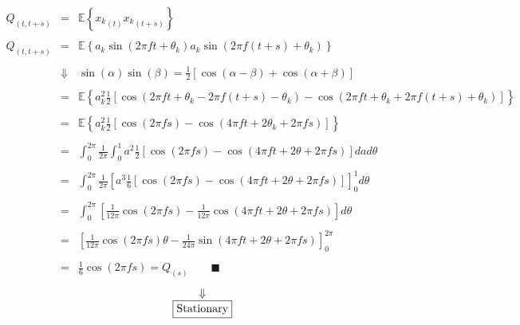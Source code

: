 \documentclass[11pt, a4paper]{article}
\begin{document}
\begin{equation}
    \begin{array}{rcl}
        Q_{\left(t,t+s\right)} & = & \displaystyle \mathbb{E}\left\{{x_k}_{\left(t\right)}{x_k}_{\left(t+s\right)}\right\} \\\\
        Q_{\left(t,t+s\right)} & = & \displaystyle \mathbb{E}\left\{a_k\sin{\left(2\pi ft+\theta_k\right)}a_k\sin{\left(2\pi f\left(t+s\right)+\theta_k\right)}\right\} \\\\
        & \Downarrow & \displaystyle \sin{\left(\alpha\right)}\sin{\left(\beta\right)}=\frac{1}{2}\left[\cos\left(\alpha-\beta\right)+\cos\left(\alpha+\beta\right)\right] \\\\
        & = & \displaystyle \mathbb{E}\left\{a_k^2\frac{1}{2}\left[\cos\left(2\pi ft+\theta_k-2\pi f\left(t+s\right)-\theta_k\right)-\cos\left(2\pi ft+\theta_k+2\pi f\left(t+s\right)+\theta_k\right)\right]\right\} \\\\
        & = & \displaystyle \mathbb{E}\left\{a_k^2\frac{1}{2}\left[\cos\left(2\pi fs\right)-\cos\left(4\pi ft+2\theta_k+2\pi fs\right)\right]\right\} \\\\
        & = & \displaystyle \int_{0}^{2\pi}{\frac{1}{2\pi}\int_{0}^{1}{a^2\frac{1}{2}\left[\cos\left(2\pi fs\right)-\cos\left(4\pi ft+2\theta+2\pi fs\right)\right]da}d\theta} \\\\
        & = & \displaystyle \int_{0}^{2\pi}{\frac{1}{2\pi}\left[a^3\frac{1}{6}\left[\cos\left(2\pi fs\right)-\cos\left(4\pi ft+2\theta+2\pi fs\right)\right]\right]_0^1d\theta} \\\\
        & = & \displaystyle \int_{0}^{2\pi}{\left[\frac{1}{12\pi}\cos\left(2\pi fs\right)-\frac{1}{12\pi}\cos\left(4\pi ft+2\theta+2\pi fs\right)\right]d\theta} \\\\
        & = & \displaystyle \left[\frac{1}{12\pi}\cos\left(2\pi fs\right)\theta-\frac{1}{24\pi}\sin\left(4\pi ft+2\theta+2\pi fs\right)\right]_0^{2\pi} \\\\
        & = & \displaystyle \frac{1}{6}\cos\left(2\pi fs\right)=Q_{\left(s\right)}\qquad\blacksquare
    \end{array}
\end{equation}
\begin{equation*}
    \begin{array}{c}
        \Downarrow \\
        \boxed{$\text{Stationary}$}
    \end{array}
\end{equation*}
\end{document}
